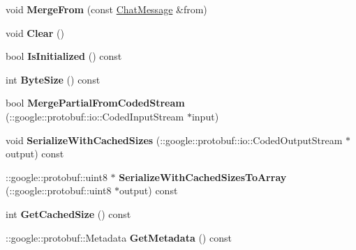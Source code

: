 \begin{DoxyCompactItemize}
\item 
\hypertarget{classSimpleChat_1_1ChatMessage_a3ed1b027416e9e87e0cccfcc667eab28}{void {\bfseries Merge\-From} (const \hyperlink{classSimpleChat_1_1ChatMessage}{Chat\-Message} \&from)}\label{classSimpleChat_1_1ChatMessage_a3ed1b027416e9e87e0cccfcc667eab28}

\item 
\hypertarget{classSimpleChat_1_1ChatMessage_aa8568ebe3b5f1f0d8178db2838bce038}{void {\bfseries Clear} ()}\label{classSimpleChat_1_1ChatMessage_aa8568ebe3b5f1f0d8178db2838bce038}

\item 
\hypertarget{classSimpleChat_1_1ChatMessage_ab63f1149ba872d70d8eefcc85072bf0c}{bool {\bfseries Is\-Initialized} () const }\label{classSimpleChat_1_1ChatMessage_ab63f1149ba872d70d8eefcc85072bf0c}

\item 
\hypertarget{classSimpleChat_1_1ChatMessage_aa70f05d5b4548467d2568c8650c38691}{int {\bfseries Byte\-Size} () const }\label{classSimpleChat_1_1ChatMessage_aa70f05d5b4548467d2568c8650c38691}

\item 
\hypertarget{classSimpleChat_1_1ChatMessage_a2d550974195d6f5937eb465bea89844e}{bool {\bfseries Merge\-Partial\-From\-Coded\-Stream} (\-::google\-::protobuf\-::io\-::\-Coded\-Input\-Stream $\ast$input)}\label{classSimpleChat_1_1ChatMessage_a2d550974195d6f5937eb465bea89844e}

\item 
\hypertarget{classSimpleChat_1_1ChatMessage_a07a1a27d06b606f2171565d473a8d800}{void {\bfseries Serialize\-With\-Cached\-Sizes} (\-::google\-::protobuf\-::io\-::\-Coded\-Output\-Stream $\ast$output) const }\label{classSimpleChat_1_1ChatMessage_a07a1a27d06b606f2171565d473a8d800}

\item 
\hypertarget{classSimpleChat_1_1ChatMessage_ac4a70b6b83215b2b3316a5977b4358ed}{\-::google\-::protobuf\-::uint8 $\ast$ {\bfseries Serialize\-With\-Cached\-Sizes\-To\-Array} (\-::google\-::protobuf\-::uint8 $\ast$output) const }\label{classSimpleChat_1_1ChatMessage_ac4a70b6b83215b2b3316a5977b4358ed}

\item 
\hypertarget{classSimpleChat_1_1ChatMessage_a1215ab1d24366ed5bf9551577f21bbc1}{int {\bfseries Get\-Cached\-Size} () const }\label{classSimpleChat_1_1ChatMessage_a1215ab1d24366ed5bf9551577f21bbc1}

\item 
\hypertarget{classSimpleChat_1_1ChatMessage_a8e0c6d4861d69d78af5217d483fccd37}{\-::google\-::protobuf\-::\-Metadata {\bfseries Get\-Metadata} () const }\label{classSimpleChat_1_1ChatMessage_a8e0c6d4861d69d78af5217d483fccd37}


\end{DoxyCompactItemize}
